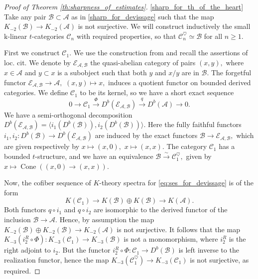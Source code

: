 \documentclass[11pt,leqno]{amsart}
\numberwithin{equation}{section}
\newcommand{\xto}{\xrightarrow}
\newcommand{\Cone}{\operatorname{Cone}}
\newcommand{\mk}{\mathrm k}
\newcommand{\cA}{{\mathcal A}}
\newcommand{\cB}{{\mathcal B}}
\newcommand{\cC}{{\mathcal C}}
\newcommand{\cE}{{\mathcal E}}
\newcommand{\la}{\langle}
\newcommand{\ra}{\rangle}
\begin{document}
\begin{proof}[Proof of Theorem \ref{th:sharpness_of_estimates}]
\ref{sharp_for_th_of_the_heart} Take any pair $\cB\subset\cA$ as in \ref{sharp_for_devissage} such that the map $K_{-2}(\cB)\to K_{-2}(\cA)$ is not surjective. We will construct inductively the small $\mk$-linear $t$-categories $\cC_n$ with required properties, so that $\cC_n^{\heartsuit}\simeq \cB$ for all $n\geq 1.$

First we construct $\cC_1.$ We use the construction from \cite[Theorem 0.3]{E25b} and recall the assertions of loc. cit. We denote by $\cE_{\cA,\cB}$ the quasi-abelian category of pairs $(x,y),$ where $x\in\cA$ and $y\subset x$ is a subobject such that both $y$ and $x/y$ are in $\cB.$ The forgetful functor $\cE_{\cA,\cB}\to\cA,$ $(x,y)\mapsto x,$ induces a quotient functor on bounded derived categories. We define $\cC_1$ to be its kernel, so we have a short exact sequence
\begin{equation}\label{eq:ses_for_devissage}
0\to \cC_1\xto{\Phi} D^b(\cE_{\cA,\cB})\xto{q} D^b(\cA)\to 0.
\end{equation}
We have a semi-orthogonal decomposition $D^b(\cE_{\cA,\cB})=\la i_1(D^b(\cB)), i_2(D^b(\cB))\ra.$ Here the fully faithful functors $i_1,i_2:D^b(\cB)\to D^b(\cE_{\cA,\cB})$ are induced by the exact functors $\cB\to\cE_{\cA,\cB},$ which are given respectively by $x\mapsto (x,0),$ $x\mapsto (x,x).$ The category $\cC_1$ has a bounded $t$-structure, and we have an equivalence $\cB\xto{\sim}\cC_1^{\heartsuit},$ given by $x\mapsto\Cone((x,0)\to (x,x)).$

Now, the cofiber sequence of $K$-theory spectra for \eqref{eq:ses_for_devissage} is of the form
\begin{equation*}
K(\cC_1)\to K(\cB)\oplus K(\cB)\to K(\cA).
\end{equation*} 
Both functors $q\circ i_1$ and $q\circ i_2$ are isomorphic to the derived functor of the inclusion $\cB\to\cA.$ Hence, by assumption the map $K_{-2}(\cB)\oplus K_{-2}(\cB)\to K_{-2}(\cA)$ is not surjective. It follows that the map $K_{-3}(i_2^R\circ \Phi):K_{-3}(\cC_1)\to K_{-3}(\cB)$ is not a monomorphism, where $i_2^R$ is the right adjoint to $i_2.$ But the functor $i_2^R\circ \Phi:\cC_1\to D^b(\cB)$ is left inverse to the realization functor, hence the map $K_{-3}(\cC_1^{\heartsuit})\to K_{-3}(\cC_1)$ is not surjective, as required.


\end{proof}
\end{document}
